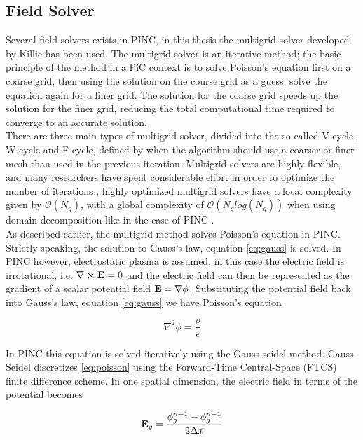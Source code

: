 \subsection{Field Solver}
Several field solvers exists in PINC, in this thesis the multigrid solver developed by Killie \parencite{Killie} has been used. The multigrid solver is an iterative method; the basic principle of the method in a PiC context is to solve Poisson's equation first on a coarse grid, then using the solution on the course grid as a guess, solve the equation again for a finer grid. The solution for the coarse grid speeds up the solution for the finer grid, reducing the total computational time required to converge to an accurate solution. 
\\
There are three main types of multigrid solver, divided into the so called V-cycle, W-cycle and F-cycle, defined by when the algorithm should use a coarser or finer mesh than used in the previous iteration. Multigrid solvers are highly flexible, and many researchers have spent considerable effort in order to optimize the number of iterations , highly optimized multigrid solvers have a local complexity given by $\mathcal{O}(N_g)$, with a global complexity of $\mathcal{O}(N_g log(N_g))$ when using domain decomposition like in the case of PINC .
\\
As described earlier, the multigrid method solves Poisson's equation in PINC. Strictly speaking, the solution to Gauss's law, equation \eqref{eq:gauss} is solved. In PINC however, electrostatic plasma is assumed, in this case the electric field is irrotational, i.e. $\nabla \cross \vb{E} = 0$ and the electric field can then be represented as the gradient of a scalar potential field $\vb{E} = \nabla \phi$.  Substituting the potential field back into Gauss's law, equation \eqref{eq:gauss} we have Poisson's equation

\begin{equation}\label{eq:poisson}
    \nabla^2 \phi = \frac{\rho}{\epsilon}
\end{equation}

In PINC this equation is solved iteratively using the Gauss-seidel method. Gauss-Seidel discretizes \eqref{eq:poisson} using the Forward-Time Central-Space (FTCS) finite difference scheme. In one spatial dimension, the electric field in terms of the potential becomes

\begin{equation}\label{eq:Ediscrete}
    \vb{E}_g = \frac{\phi^{n+1}_g - \phi^{n-1}_g}{2\Delta x}
\end{equation}

